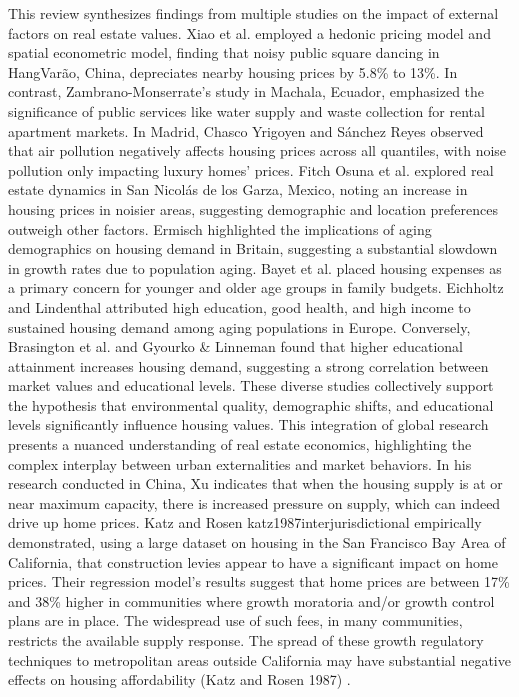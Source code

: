 \documentclass{aip-cp}
\begin{document}
This review synthesizes findings from multiple studies on the impact of external factors on real estate values. Xiao et al. \cite{XIAO2020} employed a hedonic pricing model and spatial econometric model, finding that noisy public square dancing in HangVarão, China, depreciates nearby housing prices by 5.8\% to 13\%. In contrast, Zambrano-Monserrate's \cite{zambrano2016formacion} study in Machala, Ecuador, emphasized the significance of public services like water supply and waste collection for rental apartment markets. In Madrid, Chasco Yrigoyen and Sánchez Reyes \cite{chasco2012externalidades} observed that air pollution negatively affects housing prices across all quantiles, with noise pollution only impacting luxury homes' prices. Fitch Osuna et al. \cite{fitch2013valuacion} explored real estate dynamics in San Nicolás de los Garza, Mexico, noting an increase in housing prices in noisier areas, suggesting demographic and location preferences outweigh other factors.
Ermisch \cite{ermisch1996demand} highlighted the implications of aging demographics on housing demand in Britain, suggesting a substantial slowdown in growth rates due to population aging. Bayet et al. \cite{bayet1991choix} placed housing expenses as a primary concern for younger and older age groups in family budgets. Eichholtz and Lindenthal \cite{eichholtz2014demographics} attributed high education, good health, and high income to sustained housing demand among aging populations in Europe. Conversely, Brasington et al. \cite{brasington2015house} and Gyourko \& Linneman \cite{gyourko1996analysis} found that higher educational attainment increases housing demand, suggesting a strong correlation between market values and educational levels.
These diverse studies collectively support the hypothesis that environmental quality, demographic shifts, and educational levels significantly influence housing values. This integration of global research presents a nuanced understanding of real estate economics, highlighting the complex interplay between urban externalities and market behaviors.
In his research conducted in China, Xu \cite{xu2017relationship} indicates that when the housing supply is at or near maximum capacity, there is increased pressure on supply, which can indeed drive up home prices. Katz and Rosen \cite{red}{katz1987interjurisdictional} empirically demonstrated, using a large dataset on housing in the San Francisco Bay Area of California, that construction levies appear to have a significant impact on home prices. Their regression model's results suggest that home prices are between 17\% and 38\% higher in communities where growth moratoria and/or growth control plans are in place. The widespread use of such fees, in many communities, restricts the available supply response. The spread of these growth regulatory techniques to metropolitan areas outside California may have substantial negative effects on housing affordability (Katz and Rosen 1987)  \cite{katz1987interjurisdictional}.
\end{document}
